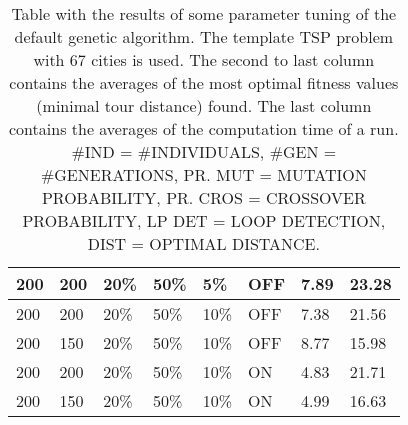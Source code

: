 \begin{table}[!]
\begin{tabular}{ | l | l | l | l | l | l | l | l | }
	200 & 200 & 20\% & 50\% & 5\% & OFF & 7.89 & 23.28 \\ \hline
	200 & 200 & 20\% & 50\% & 10\% & OFF & 7.38 & 21.56 \\ \hline
	200 & 150 & 20\% & 50\% & 10\% & OFF & 8.77 & 15.98 \\ \hline
	200 & 200 & 20\% & 50\% & 10\% & ON & 4.83 & 21.71 \\ \hline
	200 & 150 & 20\% & 50\% & 10\% & ON & 4.99 & 16.63 \\ \hline
\end{tabular}
\caption{Table with the results of some parameter tuning of the default genetic algorithm. The template TSP problem with $67$ cities is used. The second to last column contains the averages of the most optimal fitness values (minimal tour distance) found. The last column contains the averages of the computation time of a run. \#IND = \#INDIVIDUALS, \#GEN = \#GENERATIONS, PR. MUT = MUTATION PROBABILITY, PR. CROS = CROSSOVER PROBABILITY, LP DET = LOOP DETECTION, DIST = OPTIMAL DISTANCE. }
\label{table:question_2}
\end{table}
